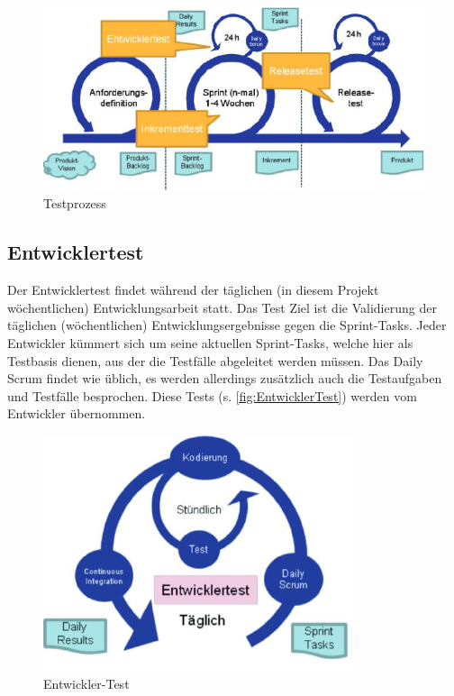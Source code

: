 \begin{figure}[!htb]
    \centering
    \includegraphics[width=.9\textwidth]{figures/rebecca/Testprozess.png}
    \caption[]{Testprozess}
    \label{fig:TestProzessBild}
\end{figure}

\subsection{Entwicklertest}
\label{sub:EntwicklerTest}

Der Entwicklertest findet während der täglichen (in diesem Projekt wöchentlichen) Entwicklungsarbeit statt. Das Test Ziel ist die Validierung der täglichen (wöchentlichen) Entwicklungsergebnisse gegen die Sprint-Tasks. Jeder Entwickler kümmert sich um seine aktuellen Sprint-Tasks, welche hier als Testbasis dienen, aus der die Testfälle abgeleitet werden müssen. Das Daily Scrum findet wie üblich, es werden allerdings zusätzlich auch die Testaufgaben und Testfälle besprochen. Diese Tests (s. \autoref{fig:EntwicklerTest}) werden vom Entwickler übernommen.

\begin{figure}[!htb]
    \centering
    \includegraphics[width=.9\textwidth]{figures/rebecca/Entwickler_Test.png}
    \caption[]{Entwickler-Test}
    \label{fig:EntwicklerTest}
\end{figure}

